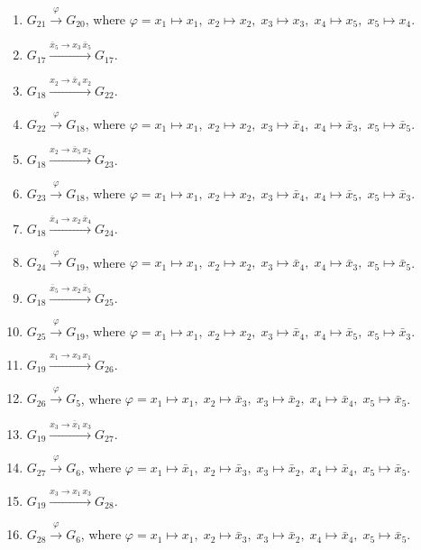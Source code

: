 \begin{enumerate}[leftmargin=*]
\item $G_{21} \xrightarrow{\varphi} G_{20}$, where $\varphi=x_{1} \mapsto x_{1},\; x_{2} \mapsto x_{2},\; x_{3} \mapsto x_{3},\; x_{4} \mapsto x_{5},\; x_{5} \mapsto x_{4}$.
\item $G_{17} \xrightarrow{\bar{x}_{5} \to x_{3}\,\bar{x}_{5}} G_{17}$.
\item $G_{18} \xrightarrow{x_{2} \to \bar{x}_{4}\,x_{2}} G_{22}$.
\item $G_{22} \xrightarrow{\varphi} G_{18}$, where $\varphi=x_{1} \mapsto x_{1},\; x_{2} \mapsto x_{2},\; x_{3} \mapsto \bar{x}_{4},\; x_{4} \mapsto \bar{x}_{3},\; x_{5} \mapsto \bar{x}_{5}$.
\item $G_{18} \xrightarrow{x_{2} \to \bar{x}_{5}\,x_{2}} G_{23}$.
\item $G_{23} \xrightarrow{\varphi} G_{18}$, where $\varphi=x_{1} \mapsto x_{1},\; x_{2} \mapsto x_{2},\; x_{3} \mapsto \bar{x}_{4},\; x_{4} \mapsto \bar{x}_{5},\; x_{5} \mapsto \bar{x}_{3}$.
\item $G_{18} \xrightarrow{\bar{x}_{4} \to x_{2}\,\bar{x}_{4}} G_{24}$.
\item $G_{24} \xrightarrow{\varphi} G_{19}$, where $\varphi=x_{1} \mapsto x_{1},\; x_{2} \mapsto x_{2},\; x_{3} \mapsto \bar{x}_{4},\; x_{4} \mapsto \bar{x}_{3},\; x_{5} \mapsto \bar{x}_{5}$.
\item $G_{18} \xrightarrow{\bar{x}_{5} \to x_{2}\,\bar{x}_{5}} G_{25}$.
\item $G_{25} \xrightarrow{\varphi} G_{19}$, where $\varphi=x_{1} \mapsto x_{1},\; x_{2} \mapsto x_{2},\; x_{3} \mapsto \bar{x}_{4},\; x_{4} \mapsto \bar{x}_{5},\; x_{5} \mapsto \bar{x}_{3}$.
\item $G_{19} \xrightarrow{x_{1} \to x_{3}\,x_{1}} G_{26}$.
\item $G_{26} \xrightarrow{\varphi} G_{5}$, where $\varphi=x_{1} \mapsto x_{1},\; x_{2} \mapsto \bar{x}_{3},\; x_{3} \mapsto \bar{x}_{2},\; x_{4} \mapsto \bar{x}_{4},\; x_{5} \mapsto \bar{x}_{5}$.
\item $G_{19} \xrightarrow{x_{3} \to \bar{x}_{1}\,x_{3}} G_{27}$.
\item $G_{27} \xrightarrow{\varphi} G_{6}$, where $\varphi=x_{1} \mapsto \bar{x}_{1},\; x_{2} \mapsto \bar{x}_{3},\; x_{3} \mapsto \bar{x}_{2},\; x_{4} \mapsto \bar{x}_{4},\; x_{5} \mapsto \bar{x}_{5}$.
\item $G_{19} \xrightarrow{x_{3} \to x_{1}\,x_{3}} G_{28}$.
\item $G_{28} \xrightarrow{\varphi} G_{6}$, where $\varphi=x_{1} \mapsto x_{1},\; x_{2} \mapsto \bar{x}_{3},\; x_{3} \mapsto \bar{x}_{2},\; x_{4} \mapsto \bar{x}_{4},\; x_{5} \mapsto \bar{x}_{5}$.

\end{enumerate}
